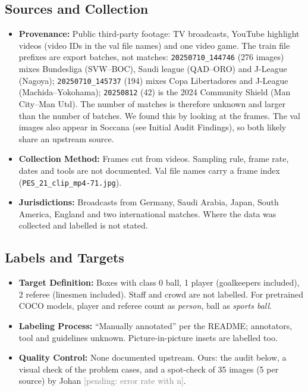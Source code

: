 \documentclass[11pt, a4paper]{article}
\newcommand{\pending}[1]{\textcolor{gray}{[pending: #1]}}
\begin{document}
\subsection{Sources and Collection}
\begin{itemize}
    \item \textbf{Provenance:} Public third-party footage: TV broadcasts, YouTube highlight videos (video IDs in the val file names) and one video game. The train file prefixes are export batches, not matches: \texttt{20250710\_144746} (276 images) mixes Bundesliga (SVW--BOC), Saudi league (QAD--ORO) and J-League (Nagoya); \texttt{20250710\_145737} (194) mixes Copa Libertadores and J-League (Machida--Yokohama); \texttt{20250812} (42) is the 2024 Community Shield (Man City--Man Utd). The number of matches is therefore unknown and larger than the number of batches. We found this by looking at the frames. The val images also appear in Soccana (see Initial Audit Findings), so both likely share an upstream source.
    \item \textbf{Collection Method:} Frames cut from videos. Sampling rule, frame rate, dates and tools are not documented. Val file names carry a frame index (\texttt{PES\_21\_clip\_mp4-71.jpg}).
    \item \textbf{Jurisdictions:} Broadcasts from Germany, Saudi Arabia, Japan, South America, England and two international matches. Where the data was collected and labelled is not stated.
\end{itemize}

\subsection{Labels and Targets}
\begin{itemize}
    \item \textbf{Target Definition:} Boxes with class 0 ball, 1 player (goalkeepers included), 2 referee (linesmen included). Staff and crowd are not labelled. For pretrained COCO models, player and referee count as \emph{person}, ball as \emph{sports ball}.
    \item \textbf{Labeling Process:} ``Manually annotated'' per the README; annotators, tool and guidelines unknown. Picture-in-picture insets are labelled too.
    \item \textbf{Quality Control:} None documented upstream. Ours: the audit below, a visual check of the problem cases, and a spot-check of 35 images (5 per source) by Johan \pending{error rate with n}.
\end{itemize}
\end{document}
